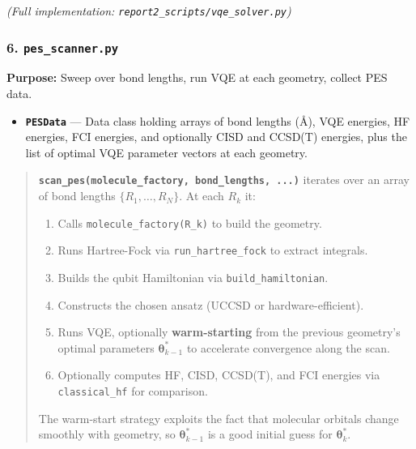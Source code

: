 \documentclass[
  11pt,
]{report}
\providecommand{\tightlist}{%
  \setlength{\itemsep}{0pt}\setlength{\parskip}{0pt}}
\begin{document}
\emph{(Full implementation: \texttt{report2\_scripts/vqe\_solver.py})}

\subsubsection{\texorpdfstring{6.
\texttt{pes\_scanner.py}}{6. pes\_scanner.py}}\label{pes_scanner.py}

\textbf{Purpose:} Sweep over bond lengths, run VQE at each geometry,
collect PES data.

\begin{itemize}
\tightlist
\item
  \textbf{\texttt{PESData}} --- Data class holding arrays of bond
  lengths (Å), VQE energies, HF energies, FCI energies, and optionally
  CISD and CCSD(T) energies, plus the list of optimal VQE parameter
  vectors at each geometry.
\end{itemize}

\begin{quote}
\textbf{\texttt{scan\_pes(molecule\_factory,\ bond\_lengths,\ ...)}}
iterates over an array of bond lengths \(\{R_1, \ldots, R_N\}\). At each
\(R_k\) it:

\begin{enumerate}
\def\labelenumi{\arabic{enumi}.}
\tightlist
\item
  Calls \texttt{molecule\_factory(R\_k)} to build the geometry.
\item
  Runs Hartree-Fock via \texttt{run\_hartree\_fock} to extract
  integrals.
\item
  Builds the qubit Hamiltonian via \texttt{build\_hamiltonian}.
\item
  Constructs the chosen ansatz (UCCSD or hardware-efficient).
\item
  Runs VQE, optionally \textbf{warm-starting} from the previous
  geometry's optimal parameters \(\boldsymbol{\theta}^*_{k-1}\) to
  accelerate convergence along the scan.
\item
  Optionally computes HF, CISD, CCSD(T), and FCI energies via
  \texttt{classical\_hf} for comparison.
\end{enumerate}

The warm-start strategy exploits the fact that molecular orbitals change
smoothly with geometry, so \(\boldsymbol{\theta}^*_{k-1}\) is a good
initial guess for \(\boldsymbol{\theta}^*_k\).
\end{quote}
\end{document}
